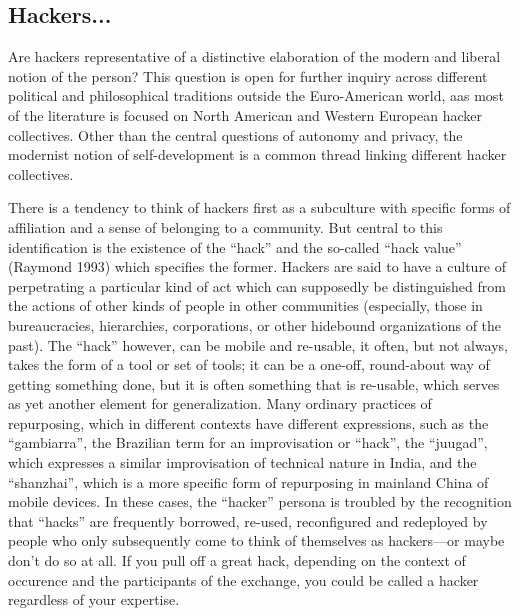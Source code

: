 \documentclass[10pt,letter,oneside]{scrartcl}
\begin{document}
\subsection{Hackers...}

Are hackers representative of a distinctive elaboration of the modern and
liberal notion of the person?  This question is open for further inquiry across
different political and philosophical traditions outside the Euro-American world,
aas most of the literature is focused on North American and Western European hacker
collectives.  Other than the central questions of autonomy and privacy, the modernist
notion of self-development is a common thread linking different hacker collectives.

There is a tendency to think of hackers first as a subculture with specific 
forms of affiliation and a sense of belonging to a community.  But central to 
this identification is the existence of the ``hack'' and the so-called ``hack 
value'' (Raymond 1993) which specifies the former.  Hackers are said to 
have a culture of perpetrating a particular kind of act which can supposedly 
be distinguished from the actions of other kinds of people in other communities 
(especially, those in bureaucracies, hierarchies, corporations, or other 
hidebound organizations of the past).  The ``hack'' however, can be mobile 
and re-usable, it often, but not always, takes the form of a tool or 
set of tools; it can be a one-off, round-about way of getting something done,
but it is often something that is re-usable, which serves as yet another element 
for generalization.  Many ordinary practices of repurposing, which in different 
contexts have different expressions, such as the ``gambiarra'', the Brazilian
term for an improvisation or ``hack'', the ``juugad'', which expresses a similar
improvisation of technical nature in India, and the ``shanzhai'', which is 
a more specific form of repurposing in mainland China of mobile devices.  In these
cases, the ``hacker'' persona is troubled by the recognition that ``hacks'' are 
frequently borrowed, re-used, reconfigured and redeployed by people who only 
subsequently come to think of themselves as hackers---or maybe don’t do so at all.  
If you pull off a great hack, depending on the context of occurence and the 
participants of the exchange, you could be called a hacker regardless of your
expertise.
\end{document}
